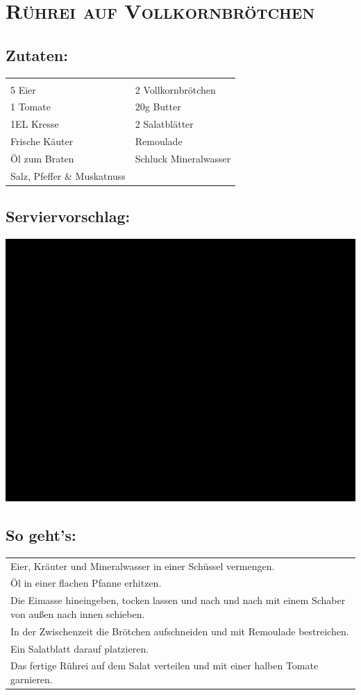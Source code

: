 \section{\textsc{Rührei auf Vollkornbrötchen}}

\subsection*{Zutaten:}

\begin{tabular}{p{7.5cm} p{7.5cm}}
	& \\
	5 Eier & 2 Vollkornbrötchen \\
	1 Tomate & 20g Butter \\
  1EL Kresse & 2 Salatblätter \\
  Frische Käuter & Remoulade \\
  Öl zum Braten & Schluck Mineralwasser \\
  Salz, Pfeffer \& Muskatnuss
\end{tabular}

\subsection*{Serviervorschlag:}

\includegraphics[width=\textwidth]{img/ph.jpg} \cite{ruehreivollkorn}

\subsection*{So geht's:}

\begin{tabular}{p{15cm}}
	\\
  Eier, Kräuter und Mineralwasser in einer Schüssel vermengen.\\
  Öl in einer flachen Pfanne erhitzen.\\
  Die Eimasse hineingeben, tocken lassen und nach und nach mit einem Schaber von außen nach innen schieben.\\
  In der Zwischenzeit die Brötchen aufschneiden und mit Remoulade bestreichen.\\
  Ein Salatblatt darauf platzieren.\\
  Das fertige Rührei auf dem Salat verteilen und mit einer halben Tomate garnieren.
\end{tabular}
